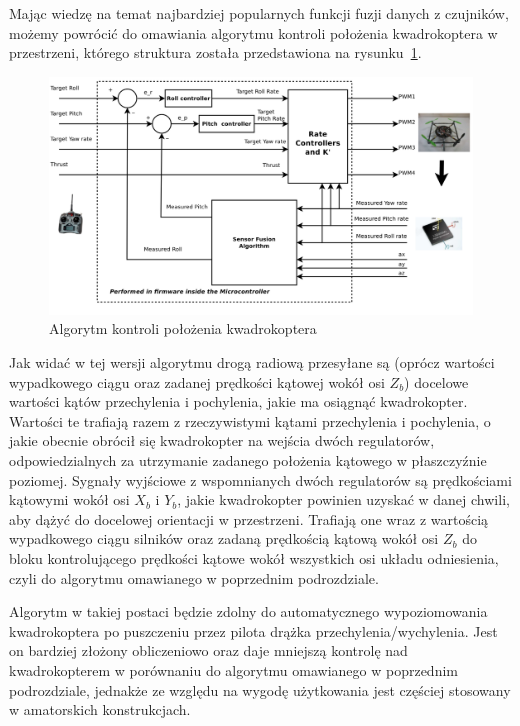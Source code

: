 Mając wiedzę na temat najbardziej popularnych funkcji fuzji danych z czujników, możemy powrócić do omawiania algorytmu kontroli położenia kwadrokoptera w przestrzeni, którego struktura została przedstawiona na rysunku~\ref{fig:angle_control_algorithm}.

\begin{figure}[H]
	\centering
	\includegraphics[width=1.0\textwidth]{Pictures/angle_control_algorithm.png}
		\caption[Algorytm kontroli położenia kwadrokoptera]{Algorytm kontroli położenia kwadrokoptera~\cite{quadro9}}
	\label{fig:angle_control_algorithm}
\end{figure}

Jak widać w tej wersji algorytmu drogą radiową przesyłane są (oprócz wartości wypadkowego ciągu oraz zadanej prędkości kątowej wokół osi $Z_b$) docelowe wartości kątów przechylenia i pochylenia, jakie ma osiągnąć kwadrokopter. Wartości te trafiają razem z rzeczywistymi kątami przechylenia i pochylenia, o jakie obecnie obrócił się kwadrokopter na wejścia dwóch regulatorów, odpowiedzialnych za utrzymanie zadanego położenia kątowego w płaszczyźnie poziomej. Sygnały wyjściowe z wspomnianych dwóch regulatorów są prędkościami kątowymi wokół osi $X_b$ i $Y_b$, jakie kwadrokopter powinien uzyskać w danej chwili, aby dążyć do docelowej orientacji w przestrzeni. Trafiają one wraz z wartością wypadkowego ciągu silników oraz zadaną prędkością kątową wokół osi $Z_b$ do bloku kontrolującego prędkości kątowe wokół wszystkich osi układu odniesienia, czyli do algorytmu omawianego w poprzednim podrozdziale. 

Algorytm w takiej postaci będzie zdolny do automatycznego wypoziomowania kwadrokoptera po puszczeniu przez pilota drążka przechylenia/wychylenia. Jest on bardziej złożony obliczeniowo  oraz daje mniejszą kontrolę nad kwadrokopterem w porównaniu do algorytmu omawianego w poprzednim podrozdziale, jednakże ze względu na wygodę użytkowania jest częściej stosowany w amatorskich konstrukcjach.
 


